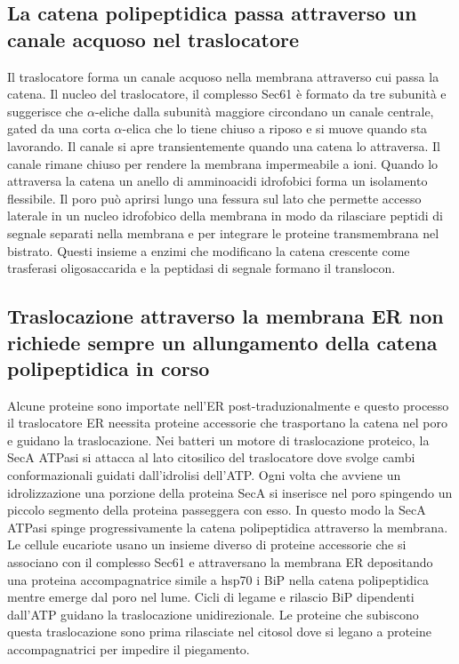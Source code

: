 \subsection{La catena polipeptidica passa attraverso un canale acquoso nel traslocatore}
Il traslocatore forma un canale acquoso nella membrana attraverso cui passa la catena. Il nucleo del traslocatore, il complesso Sec61 \`e formato da tre subunit\`a e suggerisce che 
$\alpha$-eliche dalla subunit\`a maggiore circondano un canale centrale, gated da una corta $\alpha$-elica che lo tiene chiuso a riposo e si muove quando sta lavorando. Il canale si
apre transientemente quando una catena lo attraversa. Il canale rimane chiuso per rendere la membrana impermeabile a ioni. Quando lo attraversa la catena un anello di amminoacidi 
idrofobici forma un isolamento flessibile. Il poro pu\`o aprirsi lungo una fessura sul lato che permette accesso laterale in un nucleo idrofobico della membrana in modo 
da rilasciare peptidi di segnale separati nella membrana e per integrare le proteine transmembrana nel bistrato. Questi insieme a enzimi che modificano la catena crescente come
trasferasi oligosaccarida e la peptidasi di segnale formano il translocon.
\subsection{Traslocazione attraverso la membrana ER non richiede sempre un allungamento della catena polipeptidica in corso}
Alcune proteine sono importate nell'ER post-traduzionalmente e questo processo il traslocatore ER neessita proteine accessorie che trasportano la catena nel poro e guidano la 
traslocazione. Nei batteri un motore di traslocazione proteico, la SecA ATPasi si attacca al lato citosilico del traslocatore dove svolge cambi conformazionali guidati dall'idrolisi 
dell'ATP. Ogni volta che avviene un idrolizzazione una porzione della proteina SecA si inserisce nel poro spingendo un piccolo segmento della proteina passeggera con esso. In questo 
modo la SecA ATPasi spinge progressivamente la catena polipeptidica attraverso la membrana. Le cellule eucariote usano un insieme diverso di proteine accessorie che si associano con il
complesso Sec61 e attraversano la membrana ER depositando una proteina accompagnatrice simile a hsp70 i BiP nella catena polipeptidica mentre emerge dal poro nel lume. Cicli di legame
e rilascio BiP dipendenti dall'ATP guidano la traslocazione unidirezionale. Le proteine che subiscono questa traslocazione sono prima rilasciate nel citosol dove si legano a 
proteine accompagnatrici per impedire il piegamento. 
